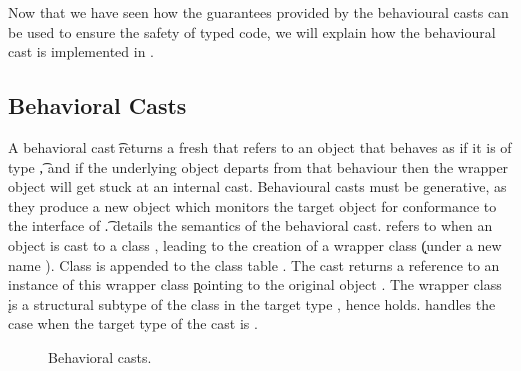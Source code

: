 \documentclass[a4paper,USenglish]{tex/lipics-v2016}
\begin{document}
Now that we have seen how the guarantees provided by the behavioural casts can 
be used to ensure the safety of typed code, we will explain how the 
behavioural cast is implemented in \kafka.


\subsection{Behavioral Casts}

A behavioral cast \BehCast\t\a returns a fresh \ap that refers to an
object that behaves as if it is of type \t, and if the underlying object
departs from that behaviour then the wrapper object will get
stuck at an internal cast. Behavioural casts must be generative, as they produce
a new object which monitors the target object for conformance to the interface 
of \t.  details the semantics of the behavioral cast. 
 refers to when an object \obj\C{\b\a} is cast to a class \Cp,
leading to the creation of a wrapper class \k (under a new name \D). 
Class \D is appended to the class table \K.  The cast returns a reference \ap to an instance of
this wrapper class \k pointing to the original object \a. The wrapper class \k is a
structural subtype of the class in the target type \C, hence \D\Sub\C holds. 
handles the case when the target type of the cast is \any.


\begin{figure}[!ht]
\hrulefill

\vspace{-2mm}

{  \small
  \begin{mathpar}

\end{mathpar}}  

\vspace{-2mm}
\hrulefill
\caption{Behavioral casts.}\label{behave}
\end{figure}
\end{document}
